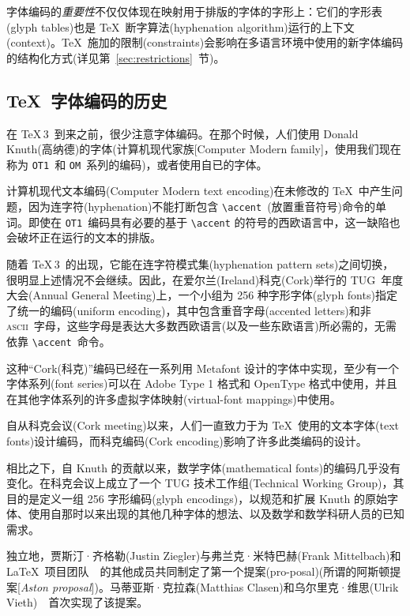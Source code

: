 \documentclass{ltxguide}[1994/11/20]
\providecommand{\Enc}[1]{\texttt{#1}}
\begin{document}
字体编码的\emph{重要性}不仅仅体现在映射用于排版的字体的字形上：它们的字形表(glyph tables)也是 \TeX{}\ 断字算法(hyphenation algorithm)运行的上下文(context)。\TeX{}\ 施加的限制(constraints)会影响在多语言环境中使用的新字体编码的结构化方式(详见第~\ref{sec:restrictions}\ 节)。

\subsection{\TeX{}\ 字体编码的历史}

在 \TeX{}\,3\ 到来之前，很少注意字体编码。在那个时候，人们使用 Donald Knuth(高纳德)的字体(计算机现代家族[Computer Modern family]，使用我们现在称为 \Enc{OT1}\ 和 \Enc{OM}\ 系列的编码)，或者使用自已的字体。

计算机现代文本编码(Computer Modern text encoding)在未修改的 \TeX{}\ 中产生问题，因为连字符(hyphenation)不能打断包含 \verb"\accent"\ (放置重音符号)命令的单词。即使在 \Enc{OT1}\ 编码具有必要的基于 \verb"\accent" 的符号的西欧语言中，这一缺陷也会破坏正在运行的文本的排版。

随着 \TeX{}\,3\ 的出现，它能在连字符模式集(hyphenation pattern sets)之间切换，很明显上述情况不会继续。因此，在爱尔兰(Ireland)科克(Cork)举行的 TUG\ 年度大会(Annual General Meeting)上，一个小组为 256 种字形字体(glyph fonts)指定了统一的编码(uniform encoding)，其中包含重音字母(accented letters)和非 \textsc{ascii}\ 字母，这些字母是表达大多数西欧语言(以及一些东欧语言)所必需的，无需依靠 \verb"\accent"\ 命令。

这种“Cork(科克)”编码已经在一系列用 Metafont 设计的字体中实现，至少有一个字体系列(font series)可以在 Adobe Type 1 格式和 OpenType 格式中使用，并且在其他字体系列的许多虚拟字体映射(virtual-font mappings)中使用。

自从科克会议(Cork meeting)以来，人们一直致力于为 \TeX{}\ 使用的文本字体(text fonts)设计编码，而科克编码(Cork encoding)影响了许多此类编码的设计。

相比之下，自 Knuth 的贡献以来，数学字体(mathematical fonts)的编码几乎没有变化。在科克会议上成立了一个 TUG 技术工作组(Technical Working Group)，其目的是定义一组 256 字形编码(glyph encodings)，以规范和扩展 Knuth 的原始字体、使用自那时以来出现的其他几种字体的想法、以及数学和数学科研人员的已知需求。

独立地，贾斯汀·齐格勒(Justin Ziegler)与弗兰克·米特巴赫(Frank Mittelbach)和 \LaTeX\ 项目团队~\cite{ziegler}~的其他成员共同制定了第一个提案(pro-posal)(所谓的阿斯顿提案[\emph{Aston proposal}])。马蒂亚斯·克拉森(Matthias Clasen)和乌尔里克·维思(Ulrik Vieth)~\cite{clasen,clasen-vieth}~首次实现了该提案。
\end{document}
